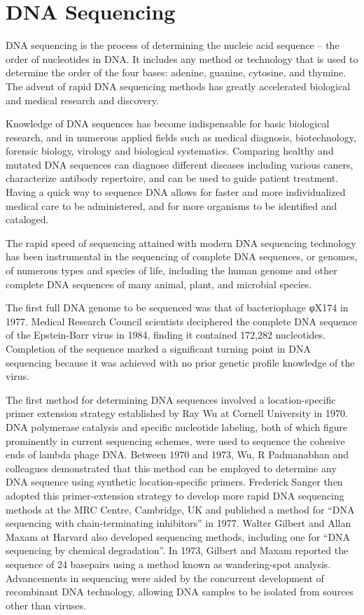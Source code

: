 \hypertarget{dna-sequencing}{%
\section{DNA Sequencing}\label{dna-sequencing}}

DNA sequencing is the process of determining the nucleic acid sequence -- the order of nucleotides in DNA. It includes any method or technology that is used to determine the order of the four bases: adenine, guanine, cytosine, and thymine. The advent of rapid DNA sequencing methods has greatly accelerated biological and medical research and discovery.

Knowledge of DNA sequences has become indispensable for basic biological research, and in numerous applied fields such as medical diagnosis, biotechnology, forensic biology, virology and biological systematics. Comparing healthy and mutated DNA sequences can diagnose different diseases including various caners, characterize antibody repertoire, and can be used to guide patient treatment. Having a quick way to sequence DNA allows for faster and more individualized medical care to be administered, and for more organisms to be identified and cataloged.

The rapid speed of sequencing attained with modern DNA sequencing technology has been instrumental in the sequencing of complete DNA sequences, or genomes, of numerous types and species of life, including the human genome and other complete DNA sequences of many animal, plant, and microbial species.

The first full DNA genome to be sequenced was that of bacteriophage φX174 in 1977. Medical Research Council scientists deciphered the complete DNA sequence of the Epstein-Barr virus in 1984, finding it contained 172,282 nucleotides. Completion of the sequence marked a significant turning point in DNA sequencing because it was achieved with no prior genetic profile knowledge of the virus.

The first method for determining DNA sequences involved a location-specific primer extension strategy established by Ray Wu at Cornell University in 1970. DNA polymerase catalysis and specific nucleotide labeling, both of which figure prominently in current sequencing schemes, were used to sequence the cohesive ends of lambda phage DNA. Between 1970 and 1973, Wu, R Padmanabhan and colleagues demonstrated that this method can be employed to determine any DNA sequence using synthetic location-specific primers. Frederick Sanger then adopted this primer-extension strategy to develop more rapid DNA sequencing methods at the MRC Centre, Cambridge, UK and published a method for ``DNA sequencing with chain-terminating inhibitors'' in 1977. Walter Gilbert and Allan Maxam at Harvard also developed sequencing methods, including one for ``DNA sequencing by chemical degradation''. In 1973, Gilbert and Maxam reported the sequence of 24 basepairs using a method known as wandering-spot analysis. Advancements in sequencing were aided by the concurrent development of recombinant DNA technology, allowing DNA samples to be isolated from sources other than viruses.

